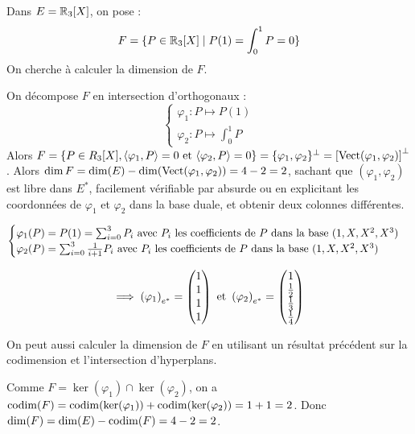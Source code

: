 \documentclass[11pt,a4paper]{report}
\begin{document}
\begin{example}
    Dans $E = \mathbb{R}_3[X]$, on pose :
    $$F = \{P \in \mathbb{R}_3[X] \mid P(1) = \int_0^1 P = 0\}$$
    On cherche à calculer la dimension de $F$.

    On décompose $F$ en intersection d'orthogonaux :
    $$\begin{cases}
        \varphi_1 : P \mapsto P(1) \\
        \varphi_2 : P \mapsto \int_0^1 P
    \end{cases}$$
    Alors $F = \{P \in R_3[X], \langle \varphi_1, P \rangle = 0 \text{ et } \langle \varphi_2, P \rangle = 0\} = \{\varphi_1, \varphi_2\}^\perp = \left[\mathrm{Vect}(\varphi_1, \varphi_2)\right]^\perp$.
    Alors $\dim F = \dim(E) - \dim(\mathrm{Vect}(\varphi_1, \varphi_2)) = 4 - 2 = 2$, sachant que $(\varphi_1, \varphi_2)$ est libre dans $E^*$, facilement vérifiable par absurde ou en explicitant les coordonnées de $\varphi_1$ et $\varphi_2$ dans la base duale, et obtenir deux colonnes différentes.

    $$\begin{cases}
    \varphi_1(P) = P(1) = \sum_{i=0}^3 P_i \text{ avec } P_i \text{ les coefficients de } P \text{ dans la base } (1, X, X^2, X^3) \\
    \varphi_2(P) = \sum_{i=0}^3 \frac{1}{i+1} P_i \text{ avec } P_i \text{ les coefficients de } P \text{ dans la base } (1, X, X^2, X^3)
    \end{cases}$$

    $$\implies
    \left(\varphi_1\right)_{e^*} = \left(\begin{matrix} 1 \\ 1 \\ 1 \\ 1 \end{matrix}\right) \text{ et } 
    \left(\varphi_2\right)_{e^*} = \left(\begin{matrix} 1 \\ \frac{1}{2} \\ \frac{1}{3} \\ \frac{1}{4} \end{matrix}\right)$$

    On peut aussi calculer la dimension de $F$ en utilisant un résultat précédent sur la codimension et l'intersection d'hyperplans.

    Comme $F = \ker(\varphi_1) \cap \ker(\varphi_2)$, on a $\mathrm{codim}(F) = \mathrm{codim}(\ker(\varphi_1)) + \mathrm{codim}(\ker(\varphi_2)) = 1 + 1 = 2$. Donc $\dim(F) = \dim(E) - \mathrm{codim}(F) = 4 - 2 = 2$.
\end{example}
\end{document}
